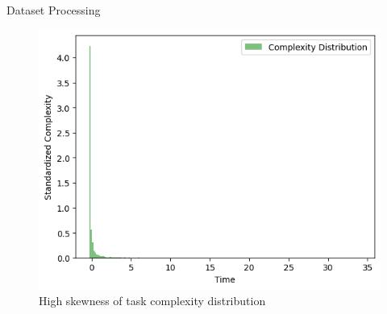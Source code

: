 \begin{frame}{Dataset Processing}
    \begin{figure}
        \centering
        \includegraphics[width=0.7\linewidth]{img/task_complexity_distribution.png}
        \caption{High skewness of task complexity distribution}
    \end{figure}
\end{frame}

